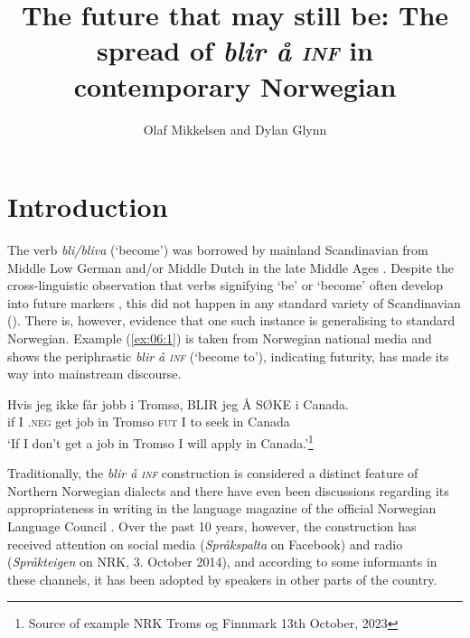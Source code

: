 \documentclass[output=paper,colorlinks,citecolor=brown]{langscibook}
\author{Olaf Mikkelsen\orcid{}\affiliation{Université Paris 8, Vincennes - Saint Denis; Adam Mickiewicz University} and         Dylan Glynn\orcid{}\affiliation{Université Paris 8, Vincennes - Saint Denis; Adam Mickiewicz University}}
\title[The future that may still be]{The future that may still be: The spread of \textit{blir å \textsc{inf}} in contemporary Norwegian}
\begin{document}
\maketitle

\section{Introduction}\label{sec:06:1}
The verb \textit{bli/bliva} (‘become’) was borrowed by mainland Scandinavian from Middle Low German and/or Middle Dutch in the late Middle Ages \citep{Markey1969}. Despite the cross-linguistic observation that verbs signifying ‘be’ or ‘become’ often develop into future markers \citep{BybeePerkinsPagliuca1994}, this did not happen in any standard variety of Scandinavian (). There is, however, evidence that one such instance is generalising to standard Norwegian. Example (\ref{ex:06:1}) is taken from Norwegian national media and shows the periphrastic \textit{blir å \textsc{inf}} (‘become to’), indicating futurity, has made its way into mainstream discourse.

\ea\label{ex:06:1}
\gll Hvis jeg ikke får jobb i Tromsø, BLIR jeg Å SØKE i Canada.\\
     if I .\textsc{neg} get job in Tromso \textsc{fut} I to seek in Canada\\
\glt ‘If I don’t get a job in Tromso I will apply in Canada.’\footnote{Source of example NRK Troms og Finnmark 13th October, 2023}
\z
{} %

Traditionally, the \textit{blir å \textsc{inf}} construction is considered a distinct feature of Northern Norwegian dialects and there have even been discussions regarding its appropriateness in writing in the language magazine of the official Norwegian Language Council \citep{jahr2009}. Over the past 10 years, however, the construction has received attention on social media (\textit{Språkspalta} on Facebook) and radio (\textit{Språkteigen} on NRK, 3. October 2014), and according to some informants in these channels, it has been adopted by speakers in other parts of the country.
\end{document}
